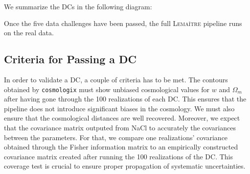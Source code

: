 We summarize the DCs in the following diagram: \\




Once the five data challenges have been passed, the full \textsc{Lemaître} pipeline runs on the real data. \\

\subsection{Criteria for Passing a DC}

In order to validate a DC, a couple of criteria has to be met. The contours obtained by \texttt{cosmologix} must show unbiased cosmological values for $w$ and $\Omega_m$ after 
having gone through the 100 realizations of each DC. This ensures that the pipeline does not introduce significant biases in the cosmology. We must also ensure that 
the cosmological distances are well recovered. Moreover, we expect that the covariance matrix outputed from NaCl to accurately the covariances between the parameters. For that, we 
compare one realizations' covariance obtained through the Fisher information matrix to an empirically constructed covariance matrix created after running the 100 realizations of 
the DC. This coverage test is crucial to ensure proper propagation of systematic uncertainties. \\

